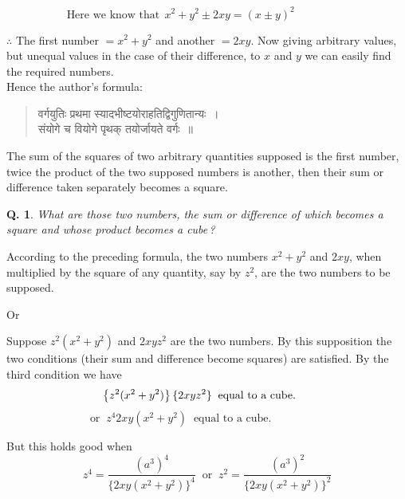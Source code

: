 \documentclass[11pt, openany]{book}
\newtheorem{question}{Q.}
\begin{document}
\begin{equation*}
   \text{Here we know that}~~ x^{2} + y^{2} \pm 2xy = (x \pm y)^{2} \hspace{2cm}
\end{equation*}

 $\therefore$\; The first number $= x^{2} + y^{2}$ and another $= 2xy$. Now 
giving arbitrary values, but unequal values in the case of 
their difference, to $x$ and $y$ we can easily find the required 
numbers. \\

\vspace{-2mm}
 Hence the author's formula: 
\begin{quote}
    \qt 
     वर्गयुतिः प्रथमा स्यादभीष्टयोराहतिद्विगुणितान्यः~। \\
 संयोगे च वियोगे पृथक् तयोर्जायते वर्गः~॥~
\end{quote}

 The sum of the squares of two arbitrary quantities 
supposed is the first number, twice the product of the two 
supposed numbers is another, then their sum or difference 
taken separately becomes a square. 
\begin{question}
  What are those two numbers, the sum or difference
of which becomes a square and whose product becomes a
cube\,? 
\end{question} 

 According to the preceding formula, the two numbers 
$x^{2} + y^{2}$ and $2xy$, when multiplied by the square of any 
quantity, say by $z^{2}$, are the two numbers to be supposed. 
\begin{center}
    Or 
\end{center}
 
 Suppose $z^{2} (x^{2} + y^{2})$ and $2xyz^{2}$ are the two
numbers. 
By this supposition the two conditions (their sum and 
difference become squares) are satisfied. 
\newpage
 By the third condition we have 
 \begin{equation*}
     \left\{ z^{2} (x^{2} + y^{2})\right\}  \{2xyz^{2}\}\;\; \text{equal to a
cube.} \hspace{5mm}
 \end{equation*}
\begin{equation*}
     \text{or}\;\; z^{4} 2xy (x^{2} + y^{2})\;\; \text{equal to a cube.} \hspace{2cm}
 \end{equation*}
 
 But this holds good when 
\begin{equation*}
     z^{4} = \dfrac{(a^{3})^{4}}{\{2xy (x^{2} + y^{2})\}^{4}}\;\; \text{or}\;\;
z^{2} = \dfrac{(a^{3})^{2}}{\{2xy (x^{2} + y^{2})\}^{2}}
 \end{equation*}
 
\end{document}
